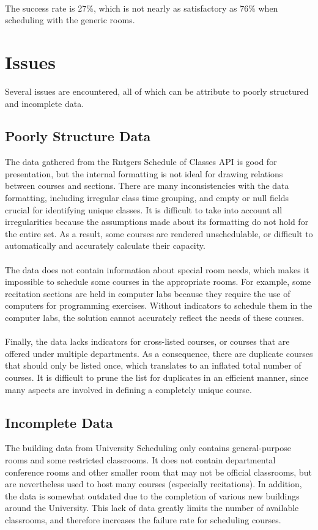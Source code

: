 \documentclass[12pt]{article}
\begin{document}
\hfill\\
The success rate is 27\%, which is not nearly as satisfactory as 76\% when scheduling with the generic rooms.

\section{Issues}
Several issues are encountered, all of which can be attribute to poorly structured and incomplete data. 

\subsection{Poorly Structure Data}
The data gathered from the Rutgers Schedule of Classes API is good for presentation, but the internal formatting is not ideal for drawing relations between courses and sections. There are many inconsistencies with the data formatting, including irregular class time grouping, and empty or null fields crucial for identifying unique classes. It is difficult to take into account all irregularities because the assumptions made about its formatting do not hold for the entire set. As a result, some courses are rendered unschedulable, or difficult to automatically and accurately calculate their capacity. 
\\\\
The data does not contain information about special room needs, which makes it impossible to schedule some courses in the appropriate rooms. For example, some recitation sections are held in computer labs because they require the use of computers for programming exercises. Without indicators to schedule them in the computer labs, the solution cannot accurately reflect the needs of these courses. 
\\\\
Finally, the data lacks indicators for cross-listed courses, or courses that are offered under multiple departments. As a consequence, there are duplicate courses that should only be listed once, which translates to an inflated total number of courses. It is difficult to prune the list for duplicates in an efficient manner, since many aspects are involved in defining a completely unique course. 
	
\subsection{Incomplete Data}
The building data from University Scheduling only contains general-purpose rooms and some restricted classrooms. It does not contain departmental conference rooms and other smaller room that may not be official classrooms, but are nevertheless used to host many courses (especially recitations). In addition, the data is somewhat outdated due to the completion of various new buildings around the University. This lack of data greatly limits the number of available classrooms, and therefore increases the failure rate for scheduling courses.
\end{document}

